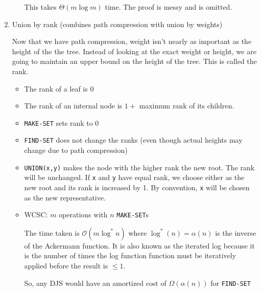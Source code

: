 \documentclass[11pt]{article}
\begin{document}
\begin{enumerate}
\begin{itemize}
        This takes $\Theta(m \log m)$ time. The proof is messy and is omitted. 
    \end{itemize}
    
    \item Union by rank (combines path compression with union by weights) 
    
    Now that we have path compression, weight isn't nearly as important as the height of the the tree. Instead of looking at the exact weight or height, we are going to maintain an upper bound on the height of the tree. This is called the rank. 
    
    \begin{itemize}
        \item The rank of a leaf is 0 
        
        \item The rank of an internal node is $1 +$ maximum rank of its children.
        
        \item \texttt{MAKE-SET} sets rank to 0
        
        \item \texttt{FIND-SET} does not change the ranks (even though actual heights may change due to path compression) 
        
        \item \texttt{UNION(x,y)} makes the node with the higher rank the new root. The rank will be unchanged. If \texttt{x} and \texttt{y} have equal rank, we choose either as the new root and its rank is increased by 1. By convention, \texttt{x} will be chosen as the new representative.
        
        \item WCSC: $m$ operations with $n$ \texttt{MAKE-SET}s
        
        The time taken is $\mathcal{O}(m \log^* n)$ where $\log^*(n) = \alpha(n)$  is the inverse of the Ackermann function. It is also known as the iterated log because it is the number of times the log function function must be iteratively applied before the result is $\leq 1$. 
        
        So, any DJS would have an amortized cost of $\Omega(\alpha(n))$ for \texttt{FIND-SET} 
        
        
    \end{itemize}
\end{enumerate}
\end{document}
